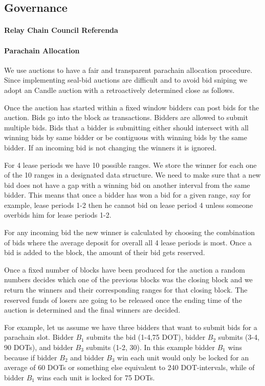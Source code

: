\subsection{Governance}\label{sec:governance}
 \paragraph{Relay Chain Council Referenda}
 \paragraph{Parachain Allocation}
We use auctions to have a fair and transparent parachain allocation procedure.
Since implementing seal-bid auctions are difficult and to avoid bid sniping we adopt an Candle auction \cite{Fuellbrunn:2012:CandleAuction} with a retroactively determined close as follows.

Once the auction has started within a fixed window bidders can post bids for the auction.
Bids go into the block as transactions.
Bidders are allowed to submit multiple bids.
Bids that a bidder is submitting either should intersect with all winning bids by same bidder or be contiguous with winning bids by the same bidder.
If an incoming bid is not changing the winners it is ignored.

For 4 lease periods we have 10 possible ranges.
We store the winner for each one of the 10 ranges in a designated data structure.
We need to make sure that a new bid does not have a gap with a winning bid on another interval from the same bidder.
This means that once a bidder has won a bid for a given range, say for example, lease periods 1-2 then he cannot bid on lease period 4 unless someone overbids him for lease periods 1-2.

For any incoming bid the new winner is calculated by choosing the combination of bids where the average deposit for overall all 4 lease periods is most.
Once a bid is added to the block, the amount of their bid gets reserved.

Once a fixed number of blocks have been produced for the auction a random numbers decides which one of the previous blocks was the closing block and we return the winners and their corresponding ranges for that closing block.
The reserved funds of losers are going to be released once the ending time of the auction is determined and the final winners are decided.

For example, let us assume we have three bidders that want to submit bids for a parachain slot.
Bidder $B_1$ submits the bid (1-4,75 DOT), bidder $B_2$ submits (3-4, 90 DOTs), and bidder $B_3$ submits (1-2, 30).
In this example bidder $B_1$ wins because if bidder $B_2$ and bidder $B_3$ win each unit would only be locked for an average of 60 DOTs or something else equivalent to 240 DOT-intervals, while of bidder $B_1$ wins each unit is locked for 75 DOTs.

